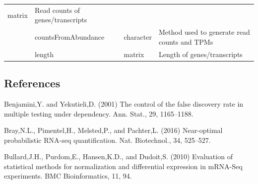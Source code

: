 \documentclass[]{article}
\begin{document}
\begin{longtable}[]{@{}llll@{}}
\begin{minipage}[t]{0.04\columnwidth}
matrix\strut
\end{minipage} & \begin{minipage}[t]{0.71\columnwidth}\raggedright\strut
Read counts of genes/transcripts\strut
\end{minipage}\tabularnewline
\begin{minipage}[t]{0.08\columnwidth}\raggedright\strut
\strut
\end{minipage} & \begin{minipage}[t]{0.06\columnwidth}\raggedright\strut
countsFromAbundance\strut
\end{minipage} & \begin{minipage}[t]{0.04\columnwidth}\raggedright\strut
character\strut
\end{minipage} & \begin{minipage}[t]{0.71\columnwidth}\raggedright\strut
Method used to generate read counts and TPMs\strut
\end{minipage}\tabularnewline
\begin{minipage}[t]{0.08\columnwidth}\raggedright\strut
\strut
\end{minipage} & \begin{minipage}[t]{0.06\columnwidth}\raggedright\strut
length\strut
\end{minipage} & \begin{minipage}[t]{0.04\columnwidth}\raggedright\strut
matrix\strut
\end{minipage} & \begin{minipage}[t]{0.71\columnwidth}\raggedright\strut
Length of genes/transcripts\strut
\end{minipage}\tabularnewline
\bottomrule
\end{longtable}

\subsection{References}\label{references}

Benjamini,Y. and Yekutieli,D. (2001) The control of the false discovery
rate in multiple testing under dependency. Ann. Stat., 29, 1165--1188.

Bray,N.L., Pimentel,H., Melsted,P., and Pachter,L. (2016) Near-optimal
probabilistic RNA-seq quantification. Nat. Biotechnol., 34, 525--527.

Bullard,J.H., Purdom,E., Hansen,K.D., and Dudoit,S. (2010) Evaluation of
statistical methods for normalization and differential expression in
mRNA-Seq experiments. BMC Bioinformatics, 11, 94.
\end{document}
